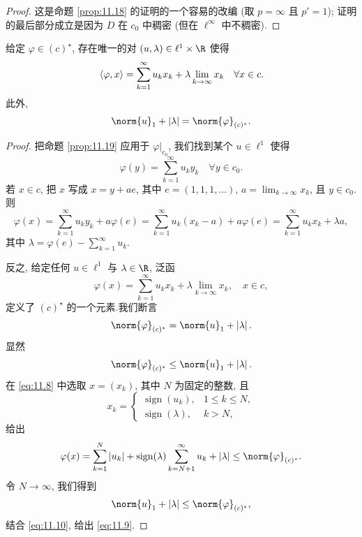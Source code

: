 \begin{proof}
这是命题  \ref{prop:11.18} 的证明的一个容易的改编 (取 $p=\infty$ 且
$p'=1$); 证明的最后部分成立是因为 $D$ 在 $c_0$ 中稠密 (但在 $\ell^\infty$
中不稠密).
\end{proof}

\begin{proposition}
\label{prop:11.20}
给定 $\varphi\in(c)^\star$, 存在唯一的对 $(u,\lambda)\in\ell^1\times\R$
使得
\begin{equation*}
\left\langle \varphi,x\right\rangle=\sum_{k=1}^\infty u_kx_k+\lambda\lim_{k\to\infty}x_k
\quad\forall x\in c.
\end{equation*}
此外,
\begin{equation*}
\norm{u}_1+\abs{\lambda}=\norm{\varphi}_{(c)^\star}.
\end{equation*}
\end{proposition}

\begin{proof}
把命题  \ref{prop:11.19} 应用于 $\varphi|_{c_0}$, 我们找到某个
$u\in\ell^1$ 使得
\begin{equation*}
\varphi(y)=\sum_{k=1}^\infty u_ky_k\quad\forall y\in c_0.
\end{equation*}
若 $x\in c$, 把 $x$ 写成 $x=y+ae$, 其中 $e=(1,1,1,\dots)$,
$a=\lim_{k\to\infty}x_k$, 且 $y\in c_0$.则
\begin{equation*}
\varphi(x)=\sum_{k=1}^\infty u_ky_k+a\varphi(e)
=\sum_{k=1}^\infty u_k(x_k-a)+a\varphi(e)
=\sum_{k=1}^\infty u_kx_k+\lambda a,
\end{equation*}
其中 $\lambda=\varphi(e)-\sum_{k=1}^\infty u_k$.

反之, 给定任何 $u\in\ell^1$ 与 $\lambda\in\R$, 泛函
\begin{equation}
\varphi(x)=\sum_{k=1}^\infty u_kx_k+\lambda\lim_{k\to\infty}x_k,
\quad x\in c,
\label{eq:11.8}
\end{equation}
定义了 $(c)^\star$ 的一个元素.我们断言
\begin{equation}
\norm{\varphi}_{(c)^\star}=\norm{u}_1+\abs{\lambda}.
\label{eq:11.9}
\end{equation}
显然
\begin{equation}
\norm{\varphi}_{(c)^\star}\le\norm{u}_1+\abs{\lambda}.
\label{eq:11.10}
\end{equation}
在 \eqref{eq:11.8} 中选取 $x=(x_k)$, 其中 $N$ 为固定的整数, 且
\begin{equation*}
x_k=\begin{cases}
\operatorname{sign}(u_k), & 1\le k\le N,\\
\operatorname{sign}(\lambda), & k>N,
\end{cases}
\end{equation*}
给出
\begin{equation*}
\varphi(x)=\sum_{k=1}^N\abs{u_k}+\operatorname{sign}(\lambda)
\sum_{k=N+1}^\infty u_k+\abs{\lambda}\le\norm{\varphi}_{(c)^\star}.
\end{equation*}
令 $N\to\infty$, 我们得到
\begin{equation*}
\norm{u}_1+\abs{\lambda}\le\norm{\varphi}_{(c)^\star},
\end{equation*}
结合 \eqref{eq:11.10}, 给出 \eqref{eq:11.9}.
\end{proof}

